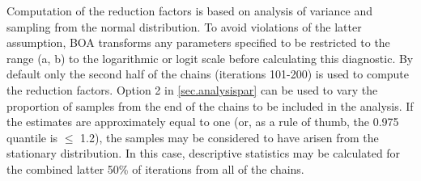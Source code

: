 \documentclass[12pt,letterpaper]{report}
\begin{document}
Computation of the reduction factors is based on analysis of variance and
sampling from the normal distribution. To avoid violations of the latter
assumption, BOA transforms any parameters specified to be restricted to the
range (a, b) to the logarithmic or logit scale before calculating this
diagnostic. By default only the second half of the chains (iterations 101-200)
is used to compute the reduction factors. Option 2 in \ref{sec.analysispar}
can be used to vary the proportion of samples from the end of the chains to be
included in the analysis. If the estimates are approximately equal to one (or,
as a rule of thumb, the 0.975 quantile is $\le$ 1.2), the samples may be
considered to have arisen from the stationary distribution. In this case,
descriptive statistics may be calculated for the combined latter 50\% of
iterations from all of the chains.
\end{document}
